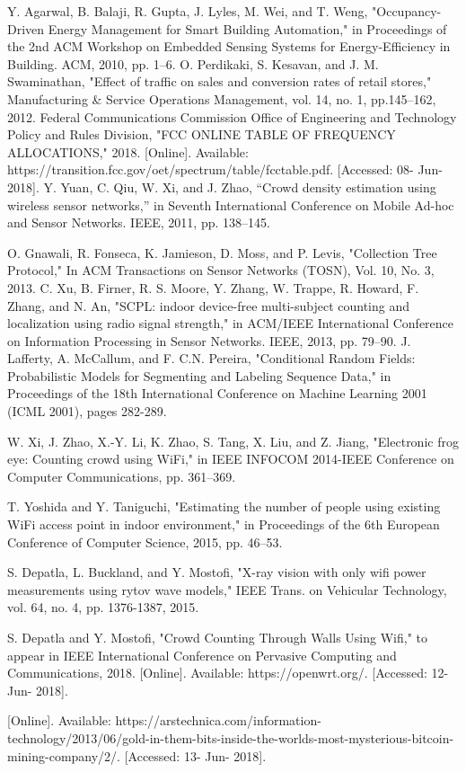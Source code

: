 \documentclass[conference]{IEEEtran}
\begin{document}
\begin{thebibliography}{00}
 Y. Agarwal, B. Balaji, R. Gupta, J. Lyles, M. Wei, and T. Weng, 
"Occupancy-Driven Energy Management for Smart Building Automation," in Proceedings of the 2nd ACM Workshop on Embedded Sensing Systems for Energy-Efficiency in Building. ACM, 2010, pp. 1–6.
 O. Perdikaki, S. Kesavan, and J. M. Swaminathan, "Effect of traffic on sales and conversion rates of retail stores," Manufacturing & Service Operations Management, vol. 14, no. 1, pp.145–162, 2012.
 Federal Communications Commission Office of Engineering and Technology Policy and Rules Division, "FCC ONLINE TABLE OF FREQUENCY ALLOCATIONS," 2018. [Online]. Available: https://transition.fcc.gov/oet/spectrum/table/fcctable.pdf. [Accessed: 08- Jun- 2018].
 Y. Yuan, C. Qiu, W. Xi, and J. Zhao, “Crowd density estimation using wireless sensor networks,” in Seventh International Conference on Mobile Ad-hoc and Sensor Networks. IEEE, 2011, pp. 138–145.


 O. Gnawali, R. Fonseca, K. Jamieson, D. Moss, and P. Levis, "Collection Tree Protocol," In ACM Transactions on Sensor Networks (TOSN), Vol. 10, No. 3, 2013.
 C. Xu, B. Firner, R. S. Moore, Y. Zhang, W. Trappe, R. Howard, F. Zhang, and N. An, "SCPL: indoor device-free multi-subject counting and localization using radio signal strength," in ACM/IEEE International Conference on Information Processing in Sensor Networks. IEEE, 2013, pp. 79–90.
 J. Lafferty, A. McCallum, and F. C.N. Pereira, "Conditional Random Fields: Probabilistic Models for Segmenting and Labeling Sequence Data," in Proceedings of the 18th International Conference on Machine Learning 2001 (ICML 2001), pages 282-289.

 W. Xi, J. Zhao, X.-Y. Li, K. Zhao, S. Tang, X. Liu, and Z. Jiang, "Electronic frog eye: Counting crowd using WiFi," in IEEE INFOCOM 2014-IEEE Conference on Computer Communications, pp. 361–369.


 T. Yoshida and Y. Taniguchi, "Estimating the number of people using existing WiFi access point in indoor environment," in Proceedings of the 6th European Conference of Computer Science, 2015, pp. 46–53.

 S. Depatla, L. Buckland, and Y. Mostofi, "X-ray vision with only wifi power measurements using rytov wave models," IEEE Trans. on Vehicular Technology, vol. 64, no. 4, pp. 1376-1387, 2015.

 S. Depatla and Y. Mostofi, "Crowd Counting Through Walls Using Wifi," to appear in IEEE International Conference on Pervasive Computing and Communications, 2018.
 [Online]. Available: https://openwrt.org/. [Accessed: 12- Jun- 2018].

 [Online]. Available: https://arstechnica.com/information-technology/2013/06/gold-in-them-bits-inside-the-worlds-most-mysterious-bitcoin-mining-company/2/. [Accessed: 13- Jun- 2018].

\end{thebibliography}
\end{document}
